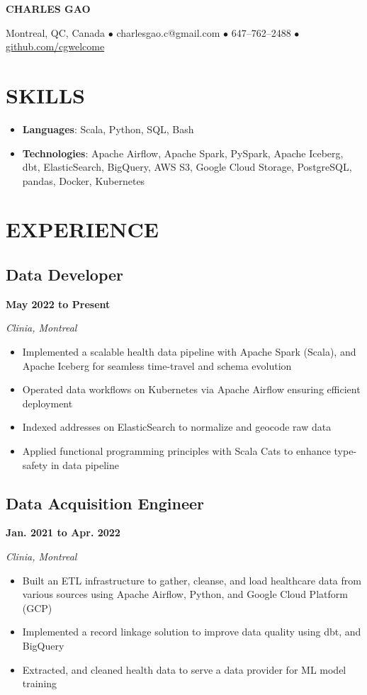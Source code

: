 \documentclass[12pt]{extarticle}
\begin{document}
\begin{center}
\textbf{\huge{CHARLES GAO}}

Montreal, QC, Canada
$\bullet$ charlesgao.c@gmail.com
$\bullet$ 647--762--2488
$\bullet$ \href{https://github.com/cgwelcome}{github.com/cgwelcome}
\end{center}

\section*{SKILLS}
\begin{itemize}
  \item \textbf{Languages}: Scala, Python, SQL, Bash
  \item \textbf{Technologies}: Apache Airflow, Apache Spark, PySpark, Apache Iceberg, dbt, ElasticSearch, BigQuery, AWS S3, Google Cloud Storage, PostgreSQL, pandas, Docker, Kubernetes
\end{itemize}



\section*{EXPERIENCE}

\subsection*{Data Developer} \hfill \textbf{May 2022 to Present}

\textit{Clinia, Montreal}
\begin{itemize}
	\item Implemented a scalable health data pipeline with Apache Spark (Scala), and Apache Iceberg for seamless time-travel and schema evolution
  \item Operated data workflows on Kubernetes via Apache Airflow ensuring efficient deployment
  \item Indexed addresses on ElasticSearch to normalize and geocode raw data
  \item Applied functional programming principles with Scala Cats to enhance type-safety in data pipeline
\end{itemize}

\subsection*{Data Acquisition Engineer} \hfill \textbf{Jan. 2021 to Apr. 2022}

\textit{Clinia, Montreal}
\begin{itemize}
  \item Built an ETL infrastructure to gather, cleanse, and load healthcare data from various sources using Apache Airflow, Python, and Google Cloud Platform (GCP)
  \item Implemented a record linkage solution to improve data quality using dbt, and BigQuery
  \item Extracted, and cleaned health data to serve a data provider for ML model training
\end{itemize}
\end{document}
